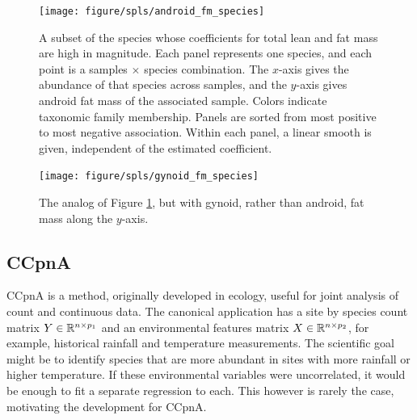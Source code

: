 \documentclass{article}
\begin{document}
\begin{figure}
  \centering
  \texttt{[image: figure/spls/android\_fm\_species]}
  \caption{A subset of the species whose coefficients for total lean and fat
    mass are high in magnitude. Each panel represents one species, and each
    point is a samples $\times$ species combination. The $x$-axis gives the
    abundance of that species across samples, and the $y$-axis gives android fat
    mass of the associated sample. Colors indicate taxonomic family membership.
    Panels are sorted from most positive to most negative association. Within
    each panel, a linear smooth is given, independent of the estimated
    coefficient.
    \label{fig:spls_android_fm_species} }
\end{figure}


\begin{figure}
  \centering
  \texttt{[image: figure/spls/gynoid\_fm\_species]}
  \caption{
    The analog of Figure \ref{fig:spls_android_fm_species}, but with gynoid,
    rather than android, fat mass along the
    $y$-axis. \label{fig:spls_gynoid_fm_species}
  }
\end{figure}

\subsection{CCpnA}
\label{subsec:canonical-correspondence}

CCpnA is a method, originally developed in ecology, useful for joint analysis of
count and continuous data. The canonical application has a site by species count
matrix $Y \in \mathbb{R}^{n \times p_{1}}$ and an environmental features matrix $X
\in \mathbb{R}^{n \times p_{2}}$, for example, historical rainfall and temperature
measurements. The scientific goal might be to identify species that are more
abundant in sites with more rainfall or higher temperature. If these
environmental variables were uncorrelated, it would be enough to fit a separate
regression to each. This however is rarely the case, motivating the development
for CCpnA.
\end{document}
